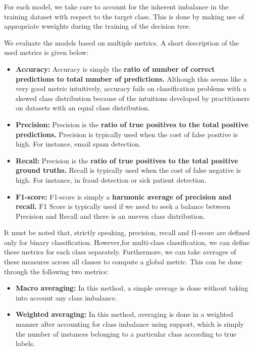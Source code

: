 \documentclass[conference]{IEEEtran}
\begin{document}
For each model, we take care to account for the inherent imbalance in the training dataset with respect to the target class. This is done by making use of appropriate wweights during the training of the decision tree.

We evaluate the models based on multiple metrics. A short description of the used metrics is given below:

\begin{itemize}
    \item \textbf{Accuracy:}
    Accuracy is simply the \textbf{ratio of number of correct predictions to total number of predictions.} Although this seems like a very good metric intuitively, accuracy fails on classification problems with a skewed class distribution because of the intuitions developed by practitioners on datasets with an equal class distribution.
    \item \textbf{Precision:}
    Precision is the \textbf{ratio of true positives to the total positive predictions.} Precision is typically used when the cost of false positive is high. For instance, email spam detection.
    \item \textbf{Recall:}
    Precision is the \textbf{ratio of true positives to the total positive ground truths.} Recall is typically used when the cost of false negative is high. For instance, in fraud detection or sick patient detection.
    \item \textbf{F1-score:}
    F1-score is simply a \textbf{harmonic average of precision and recall.} F1 Score is typically used if we need to seek a balance between Precision and Recall and there is an uneven class distribution.
    
    
\end{itemize}

It must be noted that, strictly speaking, precision, recall and f1-score are defined only for binary classification. However,for multi-class classification, we can define these metrics for each class separately. Furthermore, we can take averages of these measures across all classes to compute a global metric. This can be done through the following two metrics:
\begin{itemize}
    \item \textbf{Macro averaging:} In this method, a simple average is done without taking into account any class imbalance.
    \item \textbf{Weighted averaging:} In this method, averaging is done in a weighted manner after accounting for class imbalance using support, which is simply the number of instances belonging to a particular class according to true labels.
\end{itemize}
\end{document}
